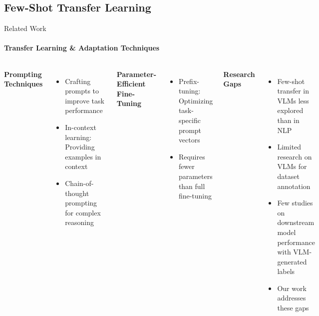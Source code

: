 \documentclass[aspectratio=169]{beamer}
\begin{document}
\subsection{Few-Shot Transfer Learning}
\begin{frame}{Related Work}
\framesubtitle{Transfer Learning \& Adaptation Techniques}
  \begin{columns}[T]
      \textbf{Prompting Techniques}
      \begin{itemize}
        \item Crafting prompts to improve task performance~
        \item In-context learning: Providing examples in context~
        \item Chain-of-thought prompting for complex reasoning~
      \end{itemize}
      \vspace{0.5em}
      \textbf{Parameter-Efficient Fine-Tuning}
      \begin{itemize}
        \item Prefix-tuning: Optimizing task-specific prompt vectors~
        \item Requires fewer parameters than full fine-tuning
      \end{itemize}
      \textbf{Research Gaps}
      \begin{itemize}
        \item Few-shot transfer in VLMs less explored than in NLP
        \item Limited research on VLMs for dataset annotation
        \item Few studies on downstream model performance with VLM-generated labels
        \item Our work addresses these gaps
      \end{itemize}
  \end{columns}
\end{frame}
\end{document}
